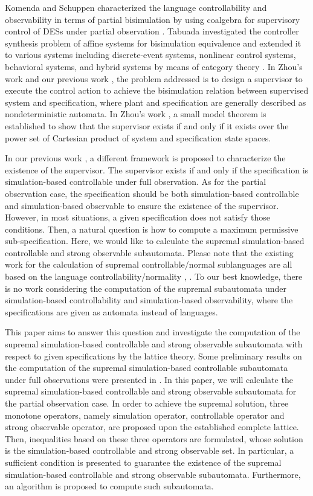 \documentclass[12pt,draftcls,onecolumn]{IEEEtran}
\begin{document}
Komenda and Schuppen characterized the language controllability
and observability in terms of partial bisimulation by using
coalgebra for supervisory control of DESs under partial
observation \cite{k1}. Tabuada investigated the controller
synthesis problem of affine systems for bisimulation equivalence
\cite{TabA} and extended it to various systems including
discrete-event systems, nonlinear control systems, behavioral
systems, and hybrid systems by means of category theory
\cite{TabC}. In Zhou's work \cite{cbis3} and our previous work
\cite{liu}, the problem addressed is to design a supervisor to
execute the control action to achieve the bisimulation relation
between supervised system and specification, where plant and
specification are generally described as nondeterministic
automata. In Zhou's work \cite{cbis3}, a small model theorem is
established to show that the supervisor exists if and only if it
exists over the power set of Cartesian product of system and
specification state spaces.

In our previous work \cite{liu}, a different framework is proposed
to characterize the existence of the supervisor. The supervisor
exists if and only if the specification is simulation-based
controllable under full observation. As for the partial
observation case, the specification should be both
simulation-based controllable and simulation-based observable to
ensure the existence of the supervisor. However, in most
situations, a given specification does not satisfy those
conditions. Then, a natural question is how to compute a maximum
permissive sub-specification. Here, we would like to calculate the
supremal simulation-based controllable and strong observable
subautomata. Please note that the existing work for the
calculation of supremal controllable/normal sublanguages are all
based on the language controllability/normality \cite{ke},
\cite{kf}. To our best knowledge, there is no work considering the
computation of the supremal subautomata under simulation-based
controllability and simulation-based observability, where the
specifications are given as automata instead of languages.


This paper aims to answer this question and investigate the
computation of the supremal simulation-based controllable and
strong observable subautomata with respect to given specifications
by the lattice theory. Some preliminary results on the computation
of the supremal simulation-based controllable subautomata under
full observations were presented in \cite{sun}. In this paper, we
will calculate the supremal simulation-based controllable and
strong observable subautomata for the partial observation case. In
order to achieve the supremal solution, three monotone operators,
namely simulation operator, controllable operator and strong
observable operator, are proposed upon the established complete
lattice. Then, inequalities based on these three operators are
formulated, whose solution is the simulation-based controllable
and strong observable set. In particular, a sufficient condition
is presented to guarantee the existence of the supremal
simulation-based controllable and strong observable subautomata.
Furthermore, an algorithm is proposed to compute such subautomata.
\end{document}
